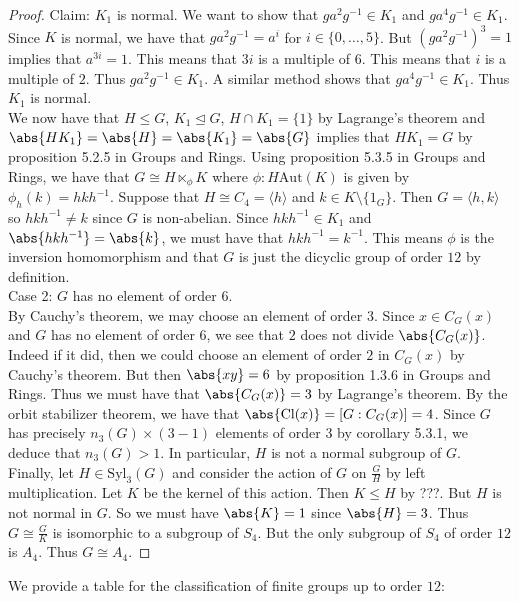 \documentclass[a4paper]{article}
\begin{document}
\begin{thm}{}{}
\begin{proof}
Claim: $K_1$ is normal. We want to show that $ga^2g^{-1}\in K_1$ and $ga^4g^{-1}\in K_1$. Since $K$ is normal, we have that $ga^2g^{-1}=a^i$ for $i\in\{0,\dots,5\}$. But $(ga^2g^{-1})^3=1$ implies that $a^{3i}=1$. This means that $3i$ is a multiple of $6$. This means that $i$ is a multiple of $2$. Thus $ga^2g^{-1}\in K_1$. A similar method shows that $ga^4g^{-1}\in K_1$. Thus $K_1$ is normal. \\

We now have that $H\leq G$, $K_1\trianglelefteq G$, $H\cap K_1=\{1\}$ by Lagrange's theorem and $\abs{HK_1}=\abs{H}=\abs{K_1}=\abs{G}$ implies that $HK_1=G$ by proposition 5.2.5 in Groups and Rings. Using proposition 5.3.5 in Groups and Rings, we have that $G\cong H\ltimes_\phi K$ where $\phi:H\text{Aut}(K)$ is given by $\phi_h(k)=hkh^{-1}$. Suppose that $H\cong C_4=\langle h\rangle$ and $k\in K\setminus\{1_G\}$. Then $G=\langle h,k\rangle$ so $hkh^{-1}\neq k$ since $G$ is non-abelian. Since $hkh^{-1}\in K_1$ and $\abs{hkh^{-1}}=\abs{k}$, we must have that $hkh^{-1}=k^{-1}$. This means $\phi$ is the inversion homomorphism and that $G$ is just the dicyclic group of order $12$ by definition. \\

Case 2: $G$ has no element of order $6$. \\
By Cauchy's theorem, we may choose an element of order $3$. Since $x\in C_G(x)$ and $G$ has no element of order $6$, we see that $2$ does not divide $\abs{C_G(x)}$. Indeed if it did, then we could choose an element of order $2$ in $C_G(x)$ by Cauchy's theorem. But then $\abs{xy}=6$ by proposition 1.3.6 in Groups and Rings. Thus we must have that $\abs{C_G(x)}=3$ by Lagrange's theorem. By the orbit stabilizer theorem, we have that $\abs{\text{Cl}(x)}=[G:C_G(x)]=4$. Since $G$ has precisely $n_3(G)\times(3-1)$ elements of order $3$ by corollary 5.3.1, we deduce that $n_3(G)>1$. In particular, $H$ is not a normal subgroup of $G$. \\

Finally, let $H\in\text{Syl}_3(G)$ and consider the action of $G$ on $\frac{G}{H}$ by left multiplication. Let $K$ be the kernel of this action. Then $K\leq H$ by ???. But $H$ is not normal in $G$. So we must have $\abs{K}=1$ since $\abs{H}=3$. Thus $G\cong\frac{G}{K}$ is isomorphic to a subgroup of $S_4$. But the only subgroup of $S_4$ of order $12$ is $A_4$. Thus $G\cong A_4$. 
\end{proof}
\end{thm}

We provide a table for the classification of finite groups up to order $12$: 
\end{document}
